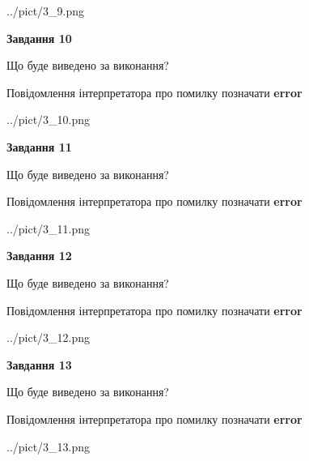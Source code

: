 \documentclass[11pt, ukrainian]{article}
\begin{document}
{\begin {large}
\begin{center}
	{../pict/3_9.png}
\end{center}
\newpage

{\begin {center}\textbf{Завдання 10}\end {center}}\par
Що буде виведено за виконання? \par
Повідомлення інтерпретатора про помилку позначати \textbf{error}

\begin{center}
	{../pict/3_10.png}
\end{center}
\newpage

{\begin {center}\textbf{Завдання 11}\end {center}}\par
Що буде виведено за виконання? \par
Повідомлення інтерпретатора про помилку позначати \textbf{error}

\begin{center}
	{../pict/3_11.png}
\end{center}
\newpage

{\begin {center}\textbf{Завдання 12}\end {center}}\par
Що буде виведено за виконання? \par
Повідомлення інтерпретатора про помилку позначати \textbf{error}

\begin{center}
	{../pict/3_12.png}
\end{center}
\newpage

{\begin {center}\textbf{Завдання 13}\end {center}}\par
Що буде виведено за виконання? \par
Повідомлення інтерпретатора про помилку позначати \textbf{error}

\begin{center}
	{../pict/3_13.png}
\end{center}
\newpage


\end{large}}
\end{document}
